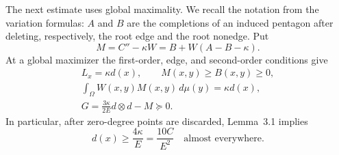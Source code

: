 The next estimate uses global maximality. We recall the notation from the
variation formulas: \(A\) and \(B\) are the completions of an induced
pentagon after deleting, respectively, the root edge and the root nonedge.
Put
\[
 M=C''-\kappa W=B+W(A-B-\kappa).
\]
At a global maximizer the first-order, edge, and second-order conditions
give
\begin{equation}
 \begin{gathered}
 L_x=\kappa d(x),\qquad M(x,y)\ge B(x,y)\ge0,\\
 \int_\Omega W(x,y)M(x,y)\,d\mu(y)=\kappa d(x),\\
 G=\frac{3\kappa}{2E}d\otimes d-M\succeq0.
 \end{gathered}\tag{14}
\end{equation}
In particular, after zero-degree points are discarded, Lemma~3.1 implies
\begin{equation}
 d(x)\ge\frac{4\kappa}{E}=\frac{10C}{E^2}
       \quad\text{almost everywhere}.\tag{15}
\end{equation}

